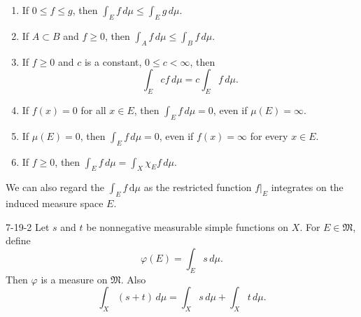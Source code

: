 \documentclass[../main.tex]{subfiles}
\begin{document}
\begin{corollary}{}{}
    \begin{enumerate}
    \item[(a)] If $0 \le f \le g$, then $\int_E f \, d\mu \le \int_E g \, d\mu$.
    \item[(b)] If $A \subset B$ and $f \ge 0$, then $\int_A f \, d\mu \le \int_B f \, d\mu$.
    \item[(c)] If $f \ge 0$ and $c$ is a constant, $0 \le c < \infty$, then
    \[
    \int_E cf \, d\mu = c \int_E f \, d\mu.
    \]
    \item[(d)] If $f(x) = 0$ for all $x \in E$, then $\int_E f \, d\mu = 0$, even if $\mu(E) = \infty$.
    \item[(e)] If $\mu(E) = 0$, then $\int_E f \, d\mu = 0$, even if $f(x) = \infty$ for every $x \in E$.
    \item[(f)] If $f \ge 0$, then $\int_E f \, d\mu = \int_X \chi_E f \, d\mu$.
\end{enumerate}
\end{corollary}

\begin{remark}
    We can also regard the \(  \int_{E} f \,\mathrm{d} \mu   \) as the restricted function \(  f|_{E}  \)  integrates on the induced measure space  \(  E  \). 
\end{remark}


\begin{proposition}{}{7-19-2}
Let $s$ and $t$ be nonnegative measurable simple functions on $X$. For $E \in \mathfrak{M}$, define
\[
\varphi(E) = \int_E s \, d\mu.
\]
Then $\varphi$ is a measure on $\mathfrak{M}$. Also
\[
\int_X (s + t) \, d\mu = \int_X s \, d\mu + \int_X t \, d\mu.
\]
\end{proposition}
\end{document}
